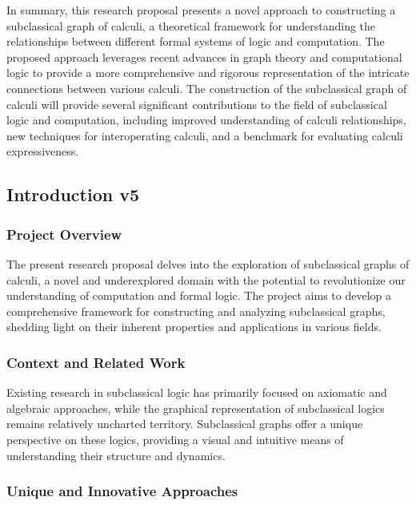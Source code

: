 In summary, this research proposal presents a novel approach to
constructing a subclassical graph of calculi, a theoretical framework
for understanding the relationships between different formal systems of
logic and computation. The proposed approach leverages recent advances
in graph theory and computational logic to provide a more comprehensive
and rigorous representation of the intricate connections between various
calculi. The construction of the subclassical graph of calculi will
provide several significant contributions to the field of subclassical
logic and computation, including improved understanding of calculi
relationships, new techniques for interoperating calculi, and a
benchmark for evaluating calculi expressiveness.

\hypertarget{introduction-v5}{%
\subsection{Introduction v5}\label{introduction-v5}}

\hypertarget{project-overview}{%
\subsubsection{Project Overview}\label{project-overview}}

The present research proposal delves into the exploration of
subclassical graphs of calculi, a novel and underexplored domain with
the potential to revolutionize our understanding of computation and
formal logic. The project aims to develop a comprehensive framework for
constructing and analyzing subclassical graphs, shedding light on their
inherent properties and applications in various fields.

\hypertarget{context-and-related-work}{%
\subsubsection{Context and Related
Work}\label{context-and-related-work}}

Existing research in subclassical logic has primarily focused on
axiomatic and algebraic approaches, while the graphical representation
of subclassical logics remains relatively uncharted territory.
Subclassical graphs offer a unique perspective on these logics,
providing a visual and intuitive means of understanding their structure
and dynamics.

\hypertarget{unique-and-innovative-approaches}{%
\subsubsection{Unique and Innovative
Approaches}\label{unique-and-innovative-approaches}}

